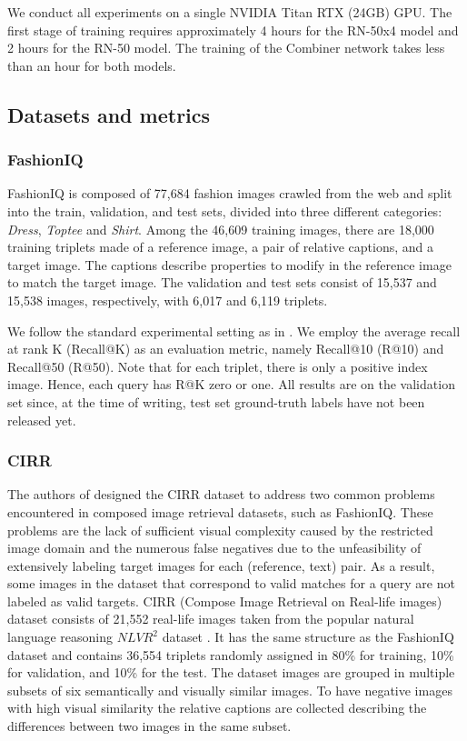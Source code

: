 \documentclass[acmlarge]{acmart}
\begin{document}
We conduct all experiments on a single NVIDIA Titan RTX (24GB) GPU. The first stage of training requires approximately 4 hours for the RN-50x4 model and 2 hours for the RN-50 model. The training of the Combiner network takes less than an hour for both models.

\subsection{Datasets and metrics}\label{sec:dataset}

\subsubsection{FashionIQ}
FashionIQ \cite{wu2021fashion} is composed of 77,684 fashion images crawled from the web and split into the train, validation, and test sets, divided into three different categories: \textit{Dress}, \textit{Toptee} and \textit{Shirt}. Among the 46,609 training images, there are 18,000 training triplets made of a reference image, a pair of relative captions, and a target image. The captions describe properties to modify in the reference image to match the target image. 
The validation and test sets consist of 15,537 and 15,538 images, respectively, with 6,017 and 6,119 triplets. 


We follow the standard experimental setting as in \cite{Lee_2021_CVPR, Kim_Yu_Kim_Kim_2021}. We employ the average recall at rank K (Recall@K) as an evaluation metric, namely Recall@10 (R@10) and Recall@50 (R@50). Note that for each triplet, there is only a positive index image. Hence, each query has R@K zero or one.
All results are on the validation set since, at the time of writing, test set ground-truth labels have not been released yet.


\subsubsection{CIRR} The authors of \cite{liu2021image} designed the CIRR dataset to address two common problems encountered in composed image retrieval datasets, such as FashionIQ. These problems are the lack of sufficient visual complexity caused by the restricted image domain and the numerous false negatives due to the unfeasibility of extensively labeling target images for each (reference, text) pair. As a result, some images in the dataset that correspond to valid matches for a query are not labeled as valid targets.
CIRR (Compose Image Retrieval on Real-life images) dataset consists of 21,552 real-life images taken from the popular natural language reasoning $NLVR^2$ dataset \cite{suhr2019corpus}. It has the same structure as the FashionIQ dataset and contains 36,554 triplets randomly assigned in 80\% for training, 10\% for validation, and 10\% for the test.
The dataset images are grouped in multiple subsets of six semantically and visually similar images. To have negative images with high visual similarity the relative captions are collected describing the differences between two images in the same subset. 
\end{document}
